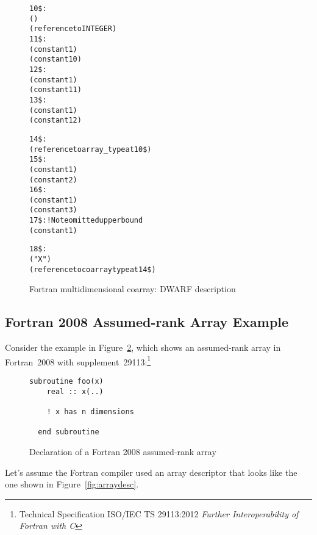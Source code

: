 \begin{figure}[here]
\begin{dwflisting}
\begin{alltt}
10\$: \DWTAGarraytype
        \DWATordering(\DWORDcolmajor)
        \DWATtype(reference to INTEGER)
11\$:    \DWTAGsubrangetype
            \DWATlowerbound(constant 1)
            \DWATupperbound(constant 10)
12\$:    \DWTAGsubrangetype
            \DWATlowerbound(constant  1)
            \DWATupperbound(constant 11)
13\$:    \DWTAGsubrangetype
            \DWATlowerbound(constant  1)
            \DWATupperbound(constant 12)

14\$: \DWTAGcoarraytype
        \DWATtype(reference to array_type at 10\$)
15\$:    \DWTAGsubrangetype
            \DWATlowerbound(constant 1)
            \DWATupperbound(constant 2)
16\$:    \DWTAGsubrangetype
            \DWATlowerbound(constant 1)
            \DWATupperbound(constant 3)
17\$:    \DWTAGsubrangetype                ! Note omitted upper bound
            \DWATlowerbound(constant 1)

18\$: \DWTAGvariable
        \DWATname("X")
        \DWATtype(reference to coarray type at 14\$)
\end{alltt}
\end{dwflisting}
\caption{Fortran multidimensional coarray: DWARF description}
\label{fig:FortranmultidimensionalcoarrayDWARFdescription}
\end{figure}


\clearpage
\subsection{Fortran 2008 Assumed-rank Array Example}
\label{app:assumedrankexample}
Consider the example in Figure~\ref{fig:assumedrankdecl}, which shows
an assumed-rank array in Fortran~2008 with
supplement~29113:\footnote{Technical Specification ISO/IEC TS
  29113:2012 \emph{Further Interoperability of Fortran with C}}

\begin{figure}[!h]
\begin{lstlisting}[language={[95]Fortran}]
  subroutine foo(x)
    real :: x(..)

    ! x has n dimensions
  
  end subroutine
\end{lstlisting}
\caption{Declaration of a Fortran 2008 assumed-rank array}
\label{fig:assumedrankdecl}
\end{figure}

Let's assume the Fortran compiler used an array descriptor that looks
like the one shown in Figure~\ref{fig:arraydesc}.

